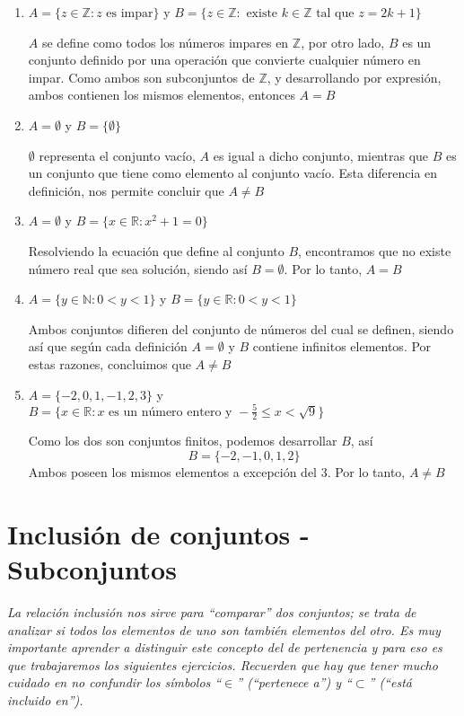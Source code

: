 \begin{enumerate}
	\item $A = \{ z \in \mathbb{Z} : z \text{ es impar} \}$ y $B = \{ z \in \mathbb{Z}: \text{ existe } k \in \mathbb{Z} \text{ tal que } z = 2k + 1 \}$
	
	$A$ se define como todos los n\'umeros impares en $\mathbb{Z}$, por otro lado, $B$ es un conjunto definido por una operaci\'on que convierte cualquier n\'umero en impar. Como ambos son subconjuntos de $\mathbb{Z}$, y desarrollando por expresi\'on, ambos contienen los mismos elementos, entonces $A = B$
	
	\item $A = \emptyset$ y $B = \{\emptyset\}$
	
	$\emptyset$ representa el conjunto vac\'io, $A$ es igual a dicho conjunto, mientras que $B$ es un conjunto que tiene como elemento al conjunto vac\'io. Esta diferencia en definici\'on, nos permite concluir que $A \neq B$
	
	\item $A = \emptyset$ y $B = \{ x \in \mathbb{R}: x^2 + 1= 0 \}$
	
	Resolviendo la ecuaci\'on que define al conjunto $B$, encontramos que no existe n\'umero real que sea soluci\'on, siendo as\'i $B = \emptyset$. Por lo tanto, $A = B$
	
	\item $A = \{ y \in \mathbb{N}: 0 < y < 1 \}$ y $B = \{ y \in \mathbb{R}: 0 < y < 1 \}$
	
	Ambos conjuntos difieren del conjunto de n\'umeros del cual se definen, siendo as\'i que seg\'un cada definici\'on $A = \emptyset$ y $B$ contiene infinitos elementos. Por estas razones, concluimos que $A \neq B$
	
	\item $A = \{ -2, 0, 1, -1, 2, 3 \}$ y $B = \{ x \in \mathbb{R}: x \text{ es un n\'umero entero y } -\frac{5}{2} \leq x < \sqrt{9} \}$
	
	Como los dos son conjuntos finitos, podemos desarrollar $B$, as\'i $$B = \{-2, -1, 0, 1, 2\}$$ Ambos poseen los mismos elementos a excepci\'on del 3. Por lo tanto, $A \neq B$
\end{enumerate}

\section{Inclusión de conjuntos - Subconjuntos}

\textit{La relación inclusión nos sirve para “comparar” dos conjuntos; se trata de analizar si todos los elementos de uno 	son también elementos del otro. Es muy importante aprender a distinguir este concepto del de pertenencia y para eso
es que trabajaremos los siguientes ejercicios. Recuerden que hay que tener mucho cuidado en no confundir los símbolos
“$\in$” (“pertenece a”) y “$\subset$” (“está incluido en”).}\\

